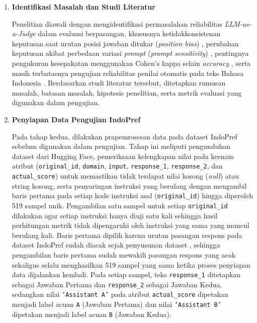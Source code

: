 \begin{enumerate}
  \item \textbf{Identifikasi Masalah dan Studi Literatur}

  Penelitian diawali dengan mengidentifikasi permasalahan reliabilitas \textit{LLM-as-a-Judge} dalam evaluasi berpasangan, khususnya ketidakkonsistenan keputusan saat urutan posisi jawaban ditukar (\textit{position bias}) \cite{zhengJudgingLLMasaJudgeMTBench2023}\cite{shiJudgingJudgesSystematic}, perubahan keputusan akibat perbedaan variasi \textit{prompt} (\textit{prompt sensitivity}) \cite{weiSystematicEvaluationLLMasaJudge2025}\cite{bellibatluJudgeSenseBenchmarkPrompt2026}, pentingnya pengukuran kesepakatan menggunakan Cohen's kappa selain \textit{accuracy} \cite{normanReliabilityValiditySystematic2026}\cite{raoAgreementMetricsLLMasJudge2026}, serta masih terbatasnya pengujian reliabilitas penilai otomatis pada teks Bahasa Indonesia \cite{dogruozChallengesRecommendationsLLMasaJudge2026}\cite{wiyonoIndoPrefMultiDomainPairwise2025}. Berdasarkan studi literatur tersebut, ditetapkan rumusan masalah, batasan masalah, hipotesis penelitian, serta metrik evaluasi yang digunakan dalam pengujian.

  \item \textbf{Penyiapan Data Pengujian IndoPref}

  Pada tahap kedua, dilakukan prapemrosesan data pada dataset IndoPref sebelum digunakan dalam pengujian. Tahap ini meliputi pengunduhan dataset dari Hugging Face, pemeriksaan kelengkapan nilai pada keenam atribut (\texttt{original\_id}, \texttt{domain}, \texttt{input}, \texttt{response\_1}, \texttt{response\_2}, dan \texttt{actual\_score}) untuk memastikan tidak terdapat nilai kosong (\textit{null}) atau string kosong, serta penyaringan instruksi yang berulang dengan mengambil baris pertama pada setiap kode instruksi asal (\texttt{original\_id}) hingga diperoleh 519 sampel unik. Pengambilan satu sampel untuk setiap \texttt{original\_id} dilakukan agar setiap instruksi hanya diuji satu kali sehingga hasil perhitungan metrik tidak dipengaruhi oleh instruksi yang sama yang muncul berulang kali. Baris pertama dipilih karena urutan pasangan respons pada dataset IndoPref sudah diacak sejak penyusunan dataset \cite{wiyonoIndoPrefMultiDomainPairwise2025}, sehingga pengambilan baris pertama sudah mewakili pasangan respons yang acak sekaligus selalu menghasilkan 519 sampel yang sama ketika proses penyiapan data dijalankan kembali. Pada setiap sampel, teks \texttt{response\_1} ditetapkan sebagai Jawaban Pertama dan \texttt{response\_2} sebagai Jawaban Kedua, sedangkan nilai \texttt{'Assistant A'} pada atribut \texttt{actual\_score} dipetakan menjadi label acuan \texttt{A} (Jawaban Pertama) dan nilai \texttt{'Assistant B'} dipetakan menjadi label acuan \texttt{B} (Jawaban Kedua).


\end{enumerate}
